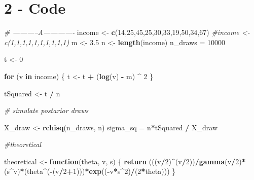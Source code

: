 \documentclass[]{article}
\newenvironment{Shaded}{\begin{snugshade}}{\end{snugshade}}
\newcommand{\KeywordTok}[1]{\textcolor[rgb]{0.13,0.29,0.53}{\textbf{#1}}}
\newcommand{\DecValTok}[1]{\textcolor[rgb]{0.00,0.00,0.81}{#1}}
\newcommand{\FloatTok}[1]{\textcolor[rgb]{0.00,0.00,0.81}{#1}}
\newcommand{\StringTok}[1]{\textcolor[rgb]{0.31,0.60,0.02}{#1}}
\newcommand{\CommentTok}[1]{\textcolor[rgb]{0.56,0.35,0.01}{\textit{#1}}}
\newcommand{\ControlFlowTok}[1]{\textcolor[rgb]{0.13,0.29,0.53}{\textbf{#1}}}
\newcommand{\OperatorTok}[1]{\textcolor[rgb]{0.81,0.36,0.00}{\textbf{#1}}}
\newcommand{\NormalTok}[1]{#1}
\begin{document}
\newpage

\section{2 - Code}\label{code-1}

\begin{Shaded}
\begin{Highlighting}[]
\CommentTok{# -----------A-------------}
\NormalTok{income <-}\StringTok{ }\KeywordTok{c}\NormalTok{(}\DecValTok{14}\NormalTok{,}\DecValTok{25}\NormalTok{,}\DecValTok{45}\NormalTok{,}\DecValTok{25}\NormalTok{,}\DecValTok{30}\NormalTok{,}\DecValTok{33}\NormalTok{,}\DecValTok{19}\NormalTok{,}\DecValTok{50}\NormalTok{,}\DecValTok{34}\NormalTok{,}\DecValTok{67}\NormalTok{)}
\CommentTok{#income <- c(1,1,1,1,1,1,1,1,1,1)}
\NormalTok{m <-}\StringTok{ }\FloatTok{3.5}
\NormalTok{n <-}\StringTok{ }\KeywordTok{length}\NormalTok{(income)}
\NormalTok{n_draws =}\StringTok{ }\DecValTok{10000}

\NormalTok{t <-}\StringTok{ }\DecValTok{0}

\ControlFlowTok{for}\NormalTok{ (v }\ControlFlowTok{in}\NormalTok{ income) \{}
\NormalTok{  t <-}\StringTok{ }\NormalTok{t }\OperatorTok{+}\StringTok{ }\NormalTok{(}\KeywordTok{log}\NormalTok{(v) }\OperatorTok{-}\StringTok{ }\NormalTok{m) }\OperatorTok{^}\StringTok{ }\DecValTok{2}
\NormalTok{\}}

\NormalTok{tSquared <-}\StringTok{ }\NormalTok{t }\OperatorTok{/}\StringTok{ }\NormalTok{n}

\CommentTok{# simulate postarior draws}

\NormalTok{X_draw <-}\StringTok{ }\KeywordTok{rchisq}\NormalTok{(n_draws, n)}
\NormalTok{sigma_sq =}\StringTok{ }\NormalTok{n}\OperatorTok{*}\NormalTok{tSquared }\OperatorTok{/}\StringTok{ }\NormalTok{X_draw}

\CommentTok{#theoretical}

\NormalTok{theoretical <-}\StringTok{ }\ControlFlowTok{function}\NormalTok{(theta, v, s) \{}
  \KeywordTok{return}\NormalTok{ (((v}\OperatorTok{/}\DecValTok{2}\NormalTok{)}\OperatorTok{^}\NormalTok{(v}\OperatorTok{/}\DecValTok{2}\NormalTok{))}\OperatorTok{/}\KeywordTok{gamma}\NormalTok{(v}\OperatorTok{/}\DecValTok{2}\NormalTok{)}\OperatorTok{*}\NormalTok{(s}\OperatorTok{^}\NormalTok{v)}\OperatorTok{*}\NormalTok{(theta}\OperatorTok{^}\NormalTok{(}\OperatorTok{-}\NormalTok{(v}\OperatorTok{/}\DecValTok{2}\OperatorTok{+}\DecValTok{1}\NormalTok{)))}\OperatorTok{*}\KeywordTok{exp}\NormalTok{((}\OperatorTok{-}\NormalTok{v}\OperatorTok{*}\NormalTok{s}\OperatorTok{^}\DecValTok{2}\NormalTok{)}\OperatorTok{/}\NormalTok{(}\DecValTok{2}\OperatorTok{*}\NormalTok{theta)))}
\NormalTok{\}}


\end{Highlighting}
\end{Shaded}
\end{document}
